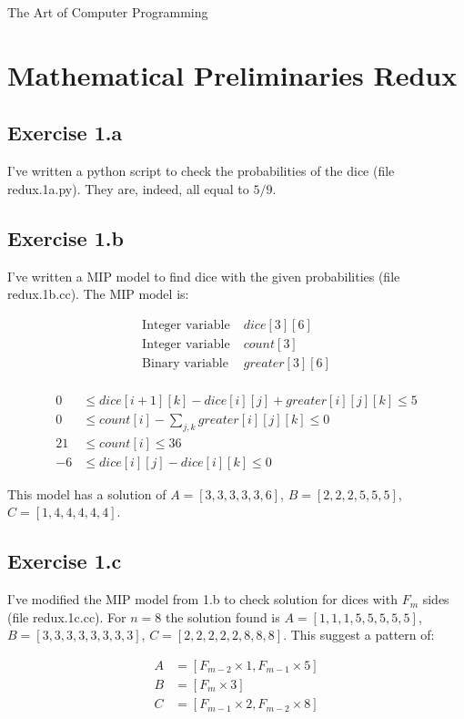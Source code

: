 \documentclass[10pt]{book}
\begin{document}
The Art of Computer Programming

\chapter{Mathematical Preliminaries Redux}

\section{Exercise 1.a}

I've written a python script to check the probabilities of the dice (file redux.1a.py). They are, indeed, all equal to $5/9$.


\section{Exercise 1.b}

I've written a MIP model to find dice with the given probabilities (file redux.1b.cc). The MIP model is:

\begin{align*}
\text{Integer variable} &\; dice[3][6] \\
\text{Integer variable} &\; count[3] \\
\text{Binary variable} &\; greater[3][6] \\
\end{align*}

\begin{align*}
0 &\le dice[i+1][k]-dice[i][j]+greater[i][j][k]\le 5 \\
0 &\le count[i] -\sum_{j,k} greater[i][j][k] \le 0 \\
21 &\le count[i] \le 36 \\
-6 &\le dice[i][j] - dice[i][k] \le 0
\end{align*}

This model has a solution of $A=[3,3,3,3,3,6]$, $B=[2,2,2,5,5,5]$,
$C=[1,4,4,4,4,4]$.

\section{Exercise 1.c}

I've modified the MIP model from 1.b to check solution for dices with $F_m$ sides (file redux.1c.cc). For $n=8$ the solution found is $A=[1,1,1,5,5,5,5,5]$, 
$B=[3,3,3,3,3,3,3,3]$, $C=[2,2,2,2,2,8,8,8]$. This suggest a pattern of:

\begin{align*}
A&=[F_{m-2}\times 1, F_{m-1}\times 5] \\
B&=[F_{m}\times 3] \\
C&=[F_{m-1}\times 2, F_{m-2}\times 8] \\
\end{align*}
\end{document}
